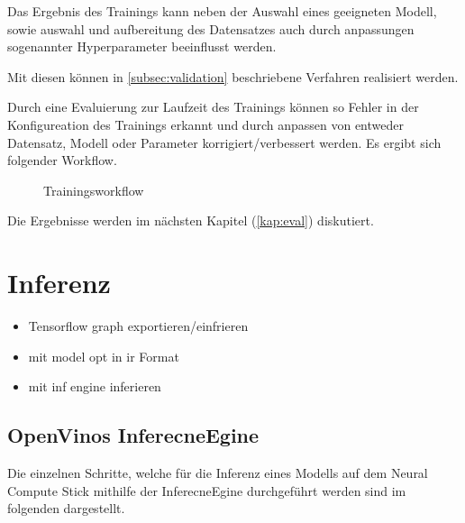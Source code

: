 Das Ergebnis des Trainings kann neben der Auswahl eines geeigneten 
Modell, sowie auswahl und aufbereitung des Datensatzes auch durch 
anpassungen sogenannter Hyperparameter beeinflusst werden.

Mit diesen können in \ref{subsec:validation} beschriebene 
Verfahren realisiert werden.

Durch eine Evaluierung zur Laufzeit des Trainings können so Fehler 
in der Konfigureation des Trainings erkannt und durch anpassen von 
entweder Datensatz, Modell oder Parameter korrigiert/verbessert 
werden.
Es ergibt sich folgender Workflow.

%     


\begin{figure}[H]
    \centering
    
    \caption{Trainingsworkflow}
    \label{fig:train_workflow}
\end{figure}


Die Ergebnisse werden im nächsten Kapitel (\ref{kap:eval}) diskutiert.

\section{Inferenz}

\begin{itemize}
    \item Tensorflow graph exportieren/einfrieren
    \item mit model opt in ir Format
    \item mit inf engine inferieren
\end{itemize}


\subsection{OpenVinos InferecneEgine}

Die einzelnen Schritte, welche für die Inferenz eines Modells 
auf dem Neural Compute Stick mithilfe der InferecneEgine 
durchgeführt werden sind im folgenden dargestellt.


